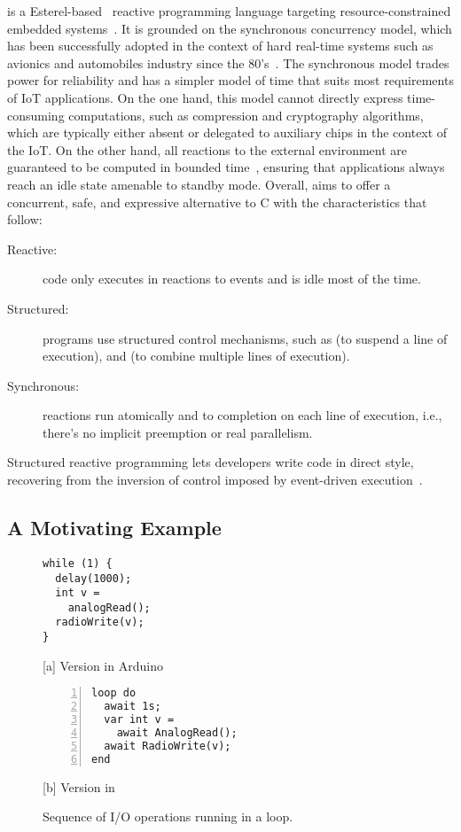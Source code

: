 \CEU is a Esterel-based~\cite{ceu.tecs17} reactive programming language
targeting resource-constrained embedded systems~\cite{ceu.sensys13}.
%
It is grounded on the synchronous concurrency model, which has been
successfully adopted in the context of hard real-time systems such as avionics
and automobiles industry since the 80's~\cite{rp.twelve}.
%
The synchronous model trades power for reliability and has a simpler model
of time that suits most requirements of IoT applications.
%
On the one hand, this model cannot directly express time-consuming
computations, such as compression and cryptography algorithms, which are
typically either absent or delegated to auxiliary chips in the context of the
IoT.
%
On the other hand, all reactions to the external environment are guaranteed to
be computed in bounded time~\cite{ceu.sensys13}, ensuring that applications
always reach an idle state amenable to standby mode.
%
Overall, \CEU aims to offer a concurrent, safe, and expressive alternative to C
with the characteristics that follow:
%
\begin{description}
\item [Reactive:] code only executes in reactions to events and is idle most of
    the time.
\item [Structured:] programs use structured control mechanisms, such as
     (to suspend a line of execution), and  (to combine
    multiple lines of execution).
\item [Synchronous:] reactions run atomically and to completion on each line of
    execution, i.e., there's no implicit preemption or real parallelism.
\end{description}
%
Structured reactive programming lets developers write code in direct style,
recovering from the inversion of control imposed by event-driven
execution~\cite{rp.deprecating,rp.rescala,sync_async.cooperative}.

\subsection{A Motivating Example}
\label{sec.ceu.example}

{\linespread{1}
\begin{figure}[t]
\vspace{2mm}
\begin{minipage}[t]{0.49\linewidth}
\begin{lstlisting}[xrightmargin=0.5cm]
while (1) {
  delay(1000);
  int v =
    analogRead();
  radioWrite(v);
}
\end{lstlisting}
\centering\small{[a] Version in Arduino}
\end{minipage}
%
\begin{minipage}[t]{0.49\linewidth}
\begin{lstlisting}[numbers=left,xleftmargin=-0.2cm]
loop do
  await 1s;
  var int v =
    await AnalogRead();
  await RadioWrite(v);
end
\end{lstlisting}
\centering\small{[b] Version in \CEU}
\end{minipage}
\caption{ Sequence of I/O operations running in a loop.
\label{lst.direct}
}
\end{figure}
}

